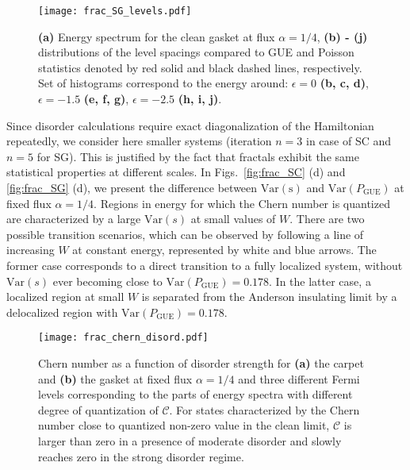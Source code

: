 \begin{figure}[H]
\centering
\texttt{[image: frac\_SG\_levels.pdf]}
\caption[Distribution of level spacings for Sierpiński gasket at different disorder strengths]{\textbf{(a)} Energy spectrum for the clean gasket at flux $\alpha = 1/4$, \textbf{(b) - (j)} distributions of the level spacings compared to GUE and Poisson statistics denoted by red solid and black dashed lines, respectively. Set of histograms correspond to the energy around: $\epsilon = 0$ \textbf{(b, c, d)}, $\epsilon = -1.5$  \textbf{(e, f, g)}, $\epsilon = -2.5$ \textbf{(h, i, j)}.}
\label{fig:SG_levels}
\end{figure}

Since disorder calculations require exact diagonalization of the Hamiltonian repeatedly, we consider here smaller systems (iteration $n = 3$ in case of SC and $n = 5$ for SG). This is justified by the fact that fractals exhibit the same statistical properties at different scales. In Figs.~\ref{fig:frac_SC} (d) and \ref{fig:frac_SG} (d), we present the difference between $\mathrm{Var (s)}$ and $\mathrm{Var}(P_{\mathrm{GUE}})$ at fixed flux $\alpha = 1/4$. Regions in energy for which the Chern number is quantized are characterized by a large $\mathrm{Var} (s)$ at small values of $W$. There are two possible transition scenarios, which can be observed by following a line of increasing $W$ at constant energy, represented by white and blue arrows. The former case corresponds to a direct transition to a fully localized system, without $\mathrm{Var} (s)$ ever becoming close to $\mathrm{Var}(P_{\mathrm{GUE}}) = 0.178$. In the latter case, a localized region at small $W$ is separated from the Anderson insulating limit by a delocalized region with $\mathrm{Var}(P_{\mathrm{GUE}}) = 0.178$. 

\begin{figure}[H]
\centering
\texttt{[image: frac\_chern\_disord.pdf]}
\caption[Chern number as a function of disorder]{Chern number as a function of disorder strength for \textbf{(a)} the carpet and \textbf{(b)} the gasket at fixed flux $\alpha = 1/4$ and three different Fermi levels corresponding to the parts of energy spectra with different degree of quantization of $\mathcal{C}$. For states characterized by the Chern number close to quantized non-zero value in the clean limit, $\mathcal{C}$ is larger than zero in a presence of moderate disorder and slowly reaches zero in the strong disorder regime.}
\label{fig:chern_disorder}
\end{figure}

